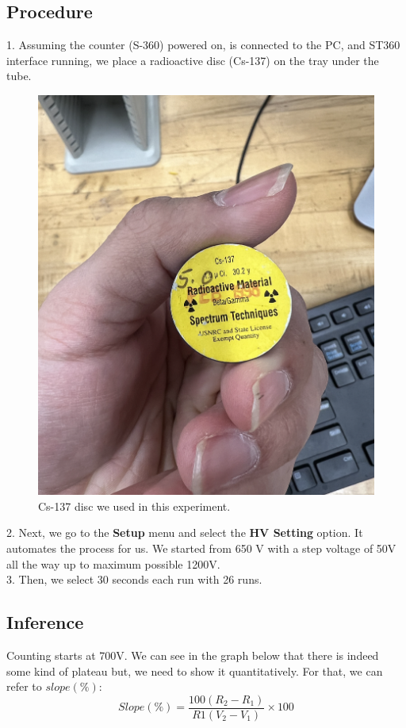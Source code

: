 \documentclass[twocolumn]{article}
\begin{document}
\subsection*{Procedure}
1. Assuming the counter (S-360) powered on, is connected to the PC, and ST360 interface running, we place a radioactive disc (Cs-137) on the tray under the tube.\\
\begin{center}
\begin{figure}[h!]
\includegraphics[scale=0.45]{disc.png}
\caption{Cs-137 disc we used in this experiment.}
\end{figure}
\end{center}
2. Next, we go to the \textbf{Setup} menu and select the \textbf{HV Setting} option. It automates the process for us. We started from 650 V with a step voltage of 50V all the way up to maximum possible 1200V.\\
3. Then, we select 30 seconds each run with 26 runs.\\
\subsection*{Inference}
 Counting starts at 700V. We can see in the graph below that there is indeed some kind of plateau but, we need to show it quantitatively. For that, we can refer to $slope(\%) $:
\begin{equation*}
Slope(\%)=\frac{100(R_2-R_1)}{R1(V_2-V_1)}\times 100
\end{equation*}
\end{document}
